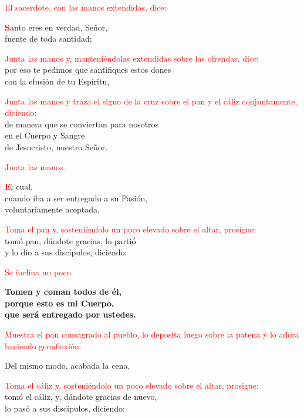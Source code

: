 \documentclass[12pt, letterpaper]{report}
\begin{document}
  \large{\textcolor{red}{El sacerdote, con las manos extendidas, dice:}}

  \Large \lettrine[lines=2]{\bfseries \textcolor{red}{S}}{}anto eres en verdad, Se\~nor,\\
  fuente de toda santidad;
  
  \clearpage

  \large{\textcolor{red}{Junta las manos y, manteni\'endolas extendidas sobre las ofrendas, dice:}}\\
  \Large por eso te pedimos que santifiques estos dones\\
  con la efusi\'on de tu Esp\'iritu,
  
  \large{\textcolor{red}{Junta las manos y traza el signo de la cruz sobre el pan y el c\'aliz conjuntamente, diciendo:}}\\
  \Large de manera que se conviertan para nosotros\\
  en el Cuerpo y \Huge{\textcolor{red}{}} \Large Sangre\\
  de Jesucristo, nuestro Se\~nor.

  \large{\textcolor{red}{Junta las manos.}}

  \Large \lettrine[lines=2]{\bfseries \textcolor{red}{E}}{}l cual,\\
  cuando iba a ser entregado a su Pasi\'on,\\
  voluntariamente aceptada,

  \large{\textcolor{red}{Toma el pan y, sosteni\'endolo un poco elevado sobre el altar, prosigue:}}\\
  \Large tom\'o pan, d\'andote gracias, lo parti\'o\\
  y lo dio a sus disc\'ipulos, diciendo:

  \large{\textcolor{red}{Se inclina un poco.}}

  \LARGE{ \bfseries{ Tomen y coman todos de \'el,\\
  porque esto es mi Cuerpo,\\
  que ser\'a entregado por ustedes.}}

  \large{\textcolor{red}{Muestra el pan consagrado al pueblo, lo deposita luego sobre la patena y lo adora haciendo genuflexi\'on.}}

  \noindent
  \Large Del mismo modo, acabada la cena,
  
  \clearpage

  \large{\textcolor{red}{Toma el c\'aliz y, sosteni\'endolo un poco elevado sobre el altar, prosigue:}}\\
  \Large tom\'o el c\'aliz, y, d\'andote gracias de nuevo,\\
  lo pas\'o a sus discípulos, diciendo:
\end{document}
